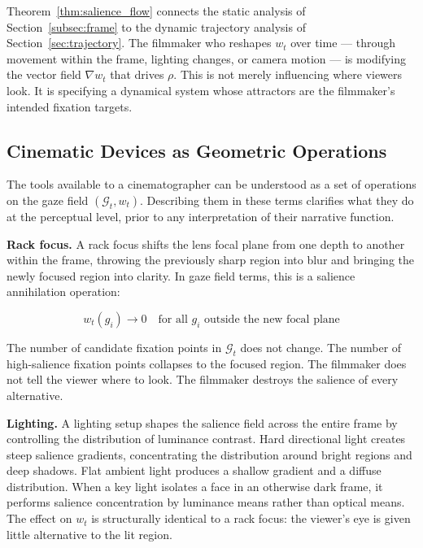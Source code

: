 \documentclass[12pt, a4paper]{article}
\theoremstyle{plain}
\theoremstyle{definition}
\theoremstyle{remark}
\newcommand{\G}{\mathcal{G}}
\newcommand{\salience}{w}
\begin{document}
Theorem~\ref{thm:salience_flow} connects the static
analysis of Section~\ref{subsec:frame} to the dynamic
trajectory analysis of Section~\ref{sec:trajectory}. The
filmmaker who reshapes $\salience_t$ over time --- through
movement within the frame, lighting changes, or camera
motion --- is modifying the vector field $\nabla
\salience_t$ that drives $\rho$. This is not merely
influencing where viewers look. It is specifying a
dynamical system whose attractors are the filmmaker's
intended fixation targets.

\subsection{Cinematic Devices as Geometric Operations}
\label{subsec:devices}

The tools available to a cinematographer can be understood
as a set of operations on the gaze field $(\G_t,
\salience_t)$. Describing them in these terms clarifies
what they do at the perceptual level, prior to any
interpretation of their narrative function.

\medskip
\noindent\textbf{Rack focus.} A rack focus shifts the lens
focal plane from one depth to another within the frame,
throwing the previously sharp region into blur and bringing
the newly focused region into clarity. In gaze field terms,
this is a salience annihilation operation:

\begin{equation}
  \salience_t(g_i) \to 0 \quad \text{for all } g_i
  \text{ outside the new focal plane}
\end{equation}

The number of candidate fixation points in $\G_t$ does not
change. The number of high-salience fixation points collapses
to the focused region. The filmmaker does not tell the viewer
where to look. The filmmaker destroys the salience of every
alternative.

\medskip
\noindent\textbf{Lighting.} A lighting setup shapes the
salience field across the entire frame by controlling the
distribution of luminance contrast. Hard directional light
creates steep salience gradients, concentrating the
distribution around bright regions and deep shadows. Flat
ambient light produces a shallow gradient and a diffuse
distribution. When a key light isolates a face in an
otherwise dark frame, it performs salience concentration by
luminance means rather than optical means. The effect on
$\salience_t$ is structurally identical to a rack focus:
the viewer's eye is given little alternative to the lit
region.
\end{document}
